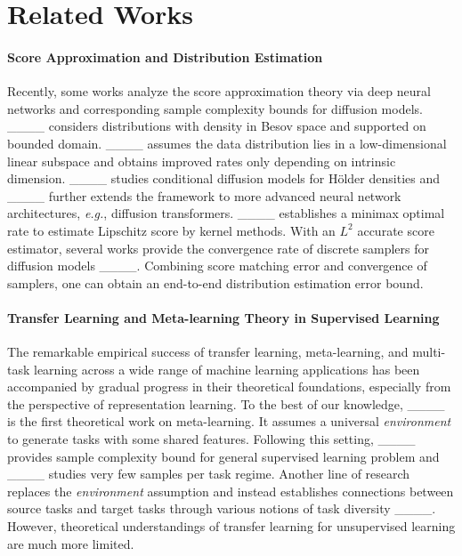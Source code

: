 \section{Related Works}
\paragraph{Score Approximation and Distribution Estimation}

Recently, some works analyze the score approximation theory via deep neural networks and corresponding sample complexity bounds for diffusion models.
____ considers distributions with density in Besov space and supported on bounded domain.
____ assumes the data distribution lies in a low-dimensional linear subspace and obtains improved rates only depending on intrinsic dimension.
____ studies conditional diffusion models for H\"older densities and ____ further extends the framework to more advanced neural network architectures, \textit{e.g.}, diffusion transformers.
____ establishes a minimax optimal rate to estimate Lipschitz score by kernel methods.
With an $L^2$ accurate score estimator, several works provide the convergence rate of discrete samplers for diffusion models ____. 
Combining score matching error and convergence of samplers, one can obtain an end-to-end distribution estimation error bound.

\paragraph{Transfer Learning and Meta-learning Theory in Supervised Learning}

The remarkable empirical success of transfer learning, meta-learning, and multi-task learning across a wide range of machine learning applications has been accompanied by gradual progress in their theoretical foundations, especially from
the perspective of representation learning.
To the best of our knowledge, ____ is the first theoretical work on meta-learning.
It assumes a universal \textit{environment} to generate tasks with some shared features.
Following this setting, ____ provides sample complexity bound for general supervised learning problem and ____ studies very few samples per task regime. 
Another line of research replaces the \textit{environment} assumption and instead establishes connections between source tasks and target tasks through various notions of task diversity ____.
However, theoretical understandings of transfer learning for unsupervised learning are much more limited.

